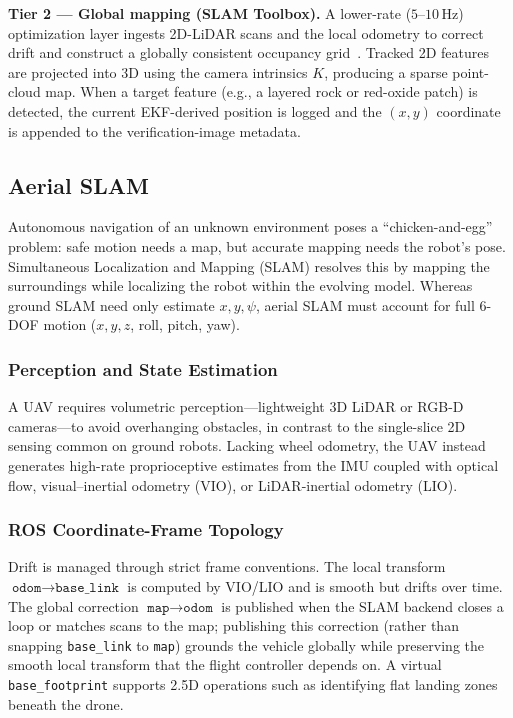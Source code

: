 \documentclass[journal]{IEEEtran}
\begin{document}
\textbf{Tier 2 --- Global mapping (SLAM Toolbox).} A lower-rate
($5$--$10$\,Hz) optimization layer ingests 2D-LiDAR scans and the local
odometry to correct drift and construct a globally consistent occupancy
grid~\cite{macenski2020slamtoolbox}. Tracked 2D features are projected into
3D using the camera intrinsics $K$, producing a sparse point-cloud map. When
a target feature (e.g., a layered rock or red-oxide patch) is detected, the
current EKF-derived position is logged and the $(x,y)$ coordinate is appended
to the verification-image metadata.

\subsection{Aerial SLAM}
Autonomous navigation of an unknown environment poses a ``chicken-and-egg''
problem: safe motion needs a map, but accurate mapping needs the robot's
pose. Simultaneous Localization and Mapping (SLAM) resolves this by mapping
the surroundings while localizing the robot within the evolving model.
Whereas ground SLAM need only estimate $x,y,\psi$, aerial SLAM must account
for full 6-DOF motion ($x,y,z$, roll, pitch, yaw).

\subsubsection{Perception and State Estimation}
A UAV requires volumetric perception---lightweight 3D LiDAR or RGB-D
cameras---to avoid overhanging obstacles, in contrast to the single-slice
2D sensing common on ground robots. Lacking wheel odometry, the UAV instead
generates high-rate proprioceptive estimates from the IMU coupled with
optical flow, visual--inertial odometry (VIO), or LiDAR-inertial odometry
(LIO).

\subsubsection{ROS Coordinate-Frame Topology}
Drift is managed through strict frame conventions. The local transform
$\texttt{odom}\!\rightarrow\!\texttt{base\_link}$ is computed by VIO/LIO and
is smooth but drifts over time. The global correction
$\texttt{map}\!\rightarrow\!\texttt{odom}$ is published when the SLAM backend
closes a loop or matches scans to the map; publishing this correction
(rather than snapping \texttt{base\_link} to \texttt{map}) grounds the
vehicle globally while preserving the smooth local transform that the flight
controller depends on. A virtual \texttt{base\_footprint} supports 2.5D
operations such as identifying flat landing zones beneath the drone.
\end{document}
